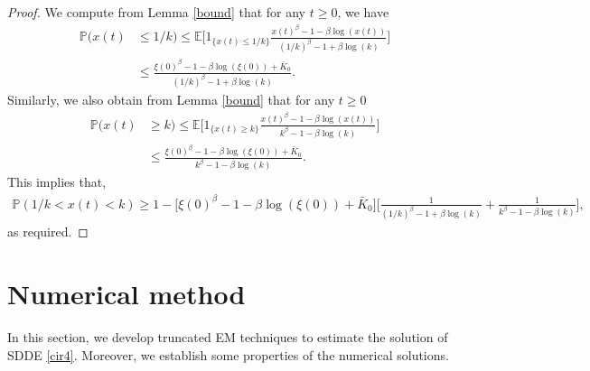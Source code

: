 \documentclass[11pt]{article}
\begin{document}
\begin{proof}
We compute from Lemma \ref{bound} that for any $t\ge 0$, we have 
\begin{align*}
\mathbb{P}(x(t)&\le 1/k)\le \mathbb{E}\Big[1_{\{x(t)\le 1/k\}}\frac{x(t)^{\beta}-1-\beta\log(x(t))}{(1/k)^{\beta}-1+\beta\log(k)}    \Big]\\
&\le \frac{\xi(0)^{\beta}-1-\beta\log(\xi(0))+\bar{K}_0}{(1/k)^{\beta}-1+\beta\log(k)}.
\end{align*}
Similarly, we also obtain from Lemma \ref{bound} that for any $t\ge 0$
\begin{align*}
\mathbb{P}(x(t)&\ge k)\le \mathbb{E}\Big[1_{\{x(t)\ge k\}}\frac{x(t)^{\beta}-1-\beta\log(x(t))}{k^{\beta}-1-\beta\log(k)}    \Big]\\
&\le \frac{\xi(0)^{\beta}-1-\beta\log(\xi(0))+\bar{K}_0}{k^{\beta}-1-\beta\log(k)}.
\end{align*}
This implies that,
\begin{align*}
\mathbb{P}(1/k< x(t)<k)\ge 1- \Big[\xi(0)^{\beta}-1-\beta\log(\xi(0))+\bar{K}_0\Big]\Big[
\frac{1}{(1/k)^{\beta}-1+\beta\log(k)} +\frac{1}{k^{\beta}-1-\beta\log(k)}\Big],
\end{align*}
as required.
\end{proof}
\section{Numerical method}\label{sect4}
In this section, we develop truncated EM techniques to estimate the solution of SDDE \eqref{cir4}. Moreover, we establish some properties of the numerical solutions.
\end{document}
